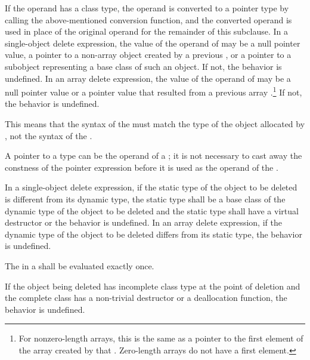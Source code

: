 \pnum
{}%
If the operand has a class type, the operand is converted to a pointer
type by calling the above-mentioned conversion function, and the
converted operand is used in place of the original operand for the
remainder of this subclause.
In a single-object delete expression, the value of the operand of
 may be a null pointer value, a pointer to a non-array object
created by a previous ,
or a pointer to a
subobject representing a base class of such an
object. If not, the behavior is undefined.
%
In an array delete expression, the value of the operand of 
may be a null pointer value or a pointer value that resulted from
a previous array .\footnote{For nonzero-length
arrays, this is the same as a pointer to the first
element of the array created by that .
Zero-length arrays do not have a first element.}
If not, the behavior is undefined.
\begin{note}
This means that the syntax of the  must
match the type of the object allocated by , not the syntax of the
.
\end{note}
\begin{note}
A pointer to a  type can be the operand of a
; it is not necessary to cast away the
constness of the pointer expression before it is
used as the operand of the .
\end{note}

\pnum
{}%
In a single-object delete expression, if the static type of the object to be
deleted is different from its dynamic type, the static type shall be a base
class of the dynamic type of the object to be deleted and the static type shall
have a virtual destructor or the behavior is undefined. In an array delete
expression, if the dynamic type of the object to be deleted differs from its
static type, the behavior is undefined.

\pnum
The  in a  shall
be evaluated exactly once.

\pnum
{}%
If the object being deleted has incomplete class type at the point of
deletion and the complete class has a non-trivial destructor or a
deallocation function, the behavior is undefined.

